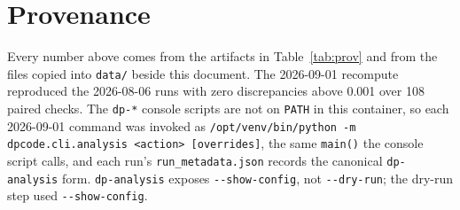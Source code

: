 \documentclass[10pt,a4paper]{article}
\begin{document}
\section{Provenance}

Every number above comes from the artifacts in Table~\ref{tab:prov} and from the files copied into
\texttt{data/} beside this document. The 2026-09-01 recompute reproduced the 2026-08-06 runs with
zero discrepancies above 0.001 over 108 paired checks. The \texttt{dp-*} console scripts are not on
\texttt{PATH} in this container, so each 2026-09-01 command was invoked as
\texttt{/opt/venv/bin/python -m dpcode.cli.analysis <action> [overrides]}, the same \texttt{main()}
the console script calls, and each run's \texttt{run\_metadata.json} records the canonical
\texttt{dp-analysis} form. \texttt{dp-analysis} exposes \texttt{-{}-show-config}, not
\texttt{-{}-dry-run}; the dry-run step used \texttt{-{}-show-config}.
\end{document}
